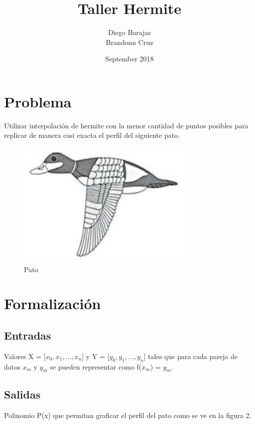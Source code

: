 \documentclass{article}
\title{Taller Hermite}
\author{Diego Barajas\\Brandonn Cruz}
\date{September 2018}
\begin{document}
\maketitle

\section{Problema}

Utilizar interpolación de hermite con la menor cantidad de puntos posibles para replicar de manera casi exacta el perfil del siguiente pato.

\begin{figure}[h!]
\centering
\includegraphics[scale=0.5]{pato.png}
\caption{Pato}
\label{fig:fisica}
\end{figure}

\section{Formalización}
\subsection{Entradas}

Valores X = [$x_0, x_1, ..., x_n$] y Y = [$y_0, y_1, ..., y_n$] tales que para cada pareja de datos $x_m$ y $y_m$ se pueden representar como f($x_m$) = $y_m$.

\subsection{Salidas}

Polinomio P(x) que permitan graficar el perfil del pato como se ve en la figura 2.
\end{document}
